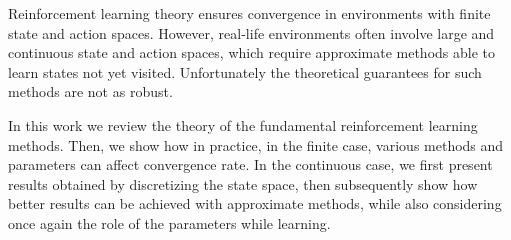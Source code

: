 \abstract
{
Reinforcement learning theory ensures convergence in environments with finite state and action spaces. However, real-life environments often involve large and continuous state and action spaces, which require approximate methods able to learn states not yet visited. Unfortunately the theoretical guarantees for such methods are not as robust.

In this work we review the theory of the fundamental reinforcement learning methods. Then, we show how in practice, in the finite case, various methods and parameters can affect convergence rate. In the continuous case, we first present results obtained by discretizing the state space, then subsequently show how better results can be achieved with approximate methods, while also considering once again the role of the parameters while learning.
}



\tableofcontents
